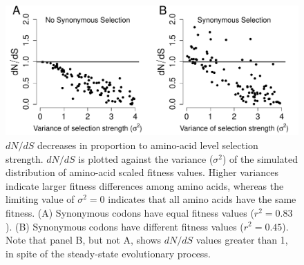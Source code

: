 \documentclass[11pt]{article}
\begin{document}
\begin{figure}[htbp]
	\centerline{\includegraphics[width=12cm]{figures/MainText/dnds_variance.pdf}}
	\caption{\label{dnds_variance} $dN/dS$ decreases in proportion to amino-acid level selection strength. $dN/dS$ is plotted against the variance ($\sigma^2$) of the simulated distribution of amino-acid scaled fitness values. Higher variances indicate larger fitness differences among amino acids, whereas the limiting value of $\sigma^2 = 0$ indicates that all amino acids have the same fitness. (A) Synonymous codons have equal fitness values ($r^2=0.83$). (B) Synonymous codons have different fitness values ($r^2=0.45$). Note that panel B, but not A, shows $dN/dS$ values greater than 1, in spite of the steady-state evolutionary process.}
\end{figure}
		
		
\vspace{2cm}
		
\end{document}
